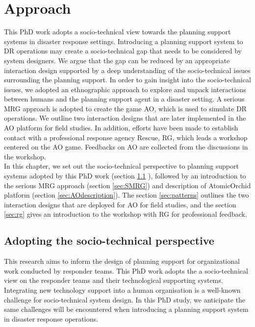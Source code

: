 \chapter{Approach}\label{ch:approach}
This PhD work adopts a socio-technical view towards the planning support systems in disaster response settings. Introducing a planning support system to \acf{DR} operations may create a socio-technical gap that needs to be considered by system designers. We argue that the gap can be reduced by an appropriate interaction design supported by a deep understanding of the socio-technical issues surrounding the planning support. In order to gain insight into the socio-technical issues, we adopted an ethnographic approach to explore and unpack interactions between humans and the planning support agent in a disaster setting. A serious \acf{MRG} approach is adopted to create the game \acf{AO}, which is used to simulate \ac{DR} operations. We outline two interaction designs that are later implemented in the \ac{AO} platform for field studies. In addition, efforts have been made to establish contact with a professional response agency Rescue, \acf{RG}, which leads a workshop centered on the \ac{AO} game. Feedbacks on \ac{AO} are collected from the discussions in the workshop. \\

In this chapter, we set out the socio-technical perspective to planning support systems adopted by this PhD work (section \ref{sec:sociotech} ), followed by an introduction to the serious \acf{MRG} approach (section \ref{sec:SMRG}) and description of AtomicOrchid platform (section \ref{sec:AOdescription}). The section \ref{sec:patterns} outlines the two interaction designs that are deployed for \ac{AO} for field studies, and the section \ref{sec:rg} gives an introduction to the workshop with \ac{RG} for professional feedback. \\


\section{Adopting the socio-technical perspective}\label{sec:sociotech}
This research aims to inform the design of planning support for organizational work conducted by responder teams. This PhD work adopts the a socio-technical view on the responder teams and their technological supporting systems. Integrating new technology support into a human organisation is a well-known challenge for socio-technical system design. In this PhD study, we anticipate the same challenges will be encountered when introducing a planning support system in disaster response operations.\\

